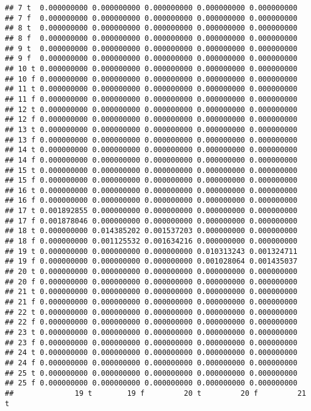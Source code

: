 \documentclass[]{article}
\begin{document}
\begin{verbatim}
## 7 t  0.000000000 0.000000000 0.000000000 0.000000000 0.000000000
## 7 f  0.000000000 0.000000000 0.000000000 0.000000000 0.000000000
## 8 t  0.000000000 0.000000000 0.000000000 0.000000000 0.000000000
## 8 f  0.000000000 0.000000000 0.000000000 0.000000000 0.000000000
## 9 t  0.000000000 0.000000000 0.000000000 0.000000000 0.000000000
## 9 f  0.000000000 0.000000000 0.000000000 0.000000000 0.000000000
## 10 t 0.000000000 0.000000000 0.000000000 0.000000000 0.000000000
## 10 f 0.000000000 0.000000000 0.000000000 0.000000000 0.000000000
## 11 t 0.000000000 0.000000000 0.000000000 0.000000000 0.000000000
## 11 f 0.000000000 0.000000000 0.000000000 0.000000000 0.000000000
## 12 t 0.000000000 0.000000000 0.000000000 0.000000000 0.000000000
## 12 f 0.000000000 0.000000000 0.000000000 0.000000000 0.000000000
## 13 t 0.000000000 0.000000000 0.000000000 0.000000000 0.000000000
## 13 f 0.000000000 0.000000000 0.000000000 0.000000000 0.000000000
## 14 t 0.000000000 0.000000000 0.000000000 0.000000000 0.000000000
## 14 f 0.000000000 0.000000000 0.000000000 0.000000000 0.000000000
## 15 t 0.000000000 0.000000000 0.000000000 0.000000000 0.000000000
## 15 f 0.000000000 0.000000000 0.000000000 0.000000000 0.000000000
## 16 t 0.000000000 0.000000000 0.000000000 0.000000000 0.000000000
## 16 f 0.000000000 0.000000000 0.000000000 0.000000000 0.000000000
## 17 t 0.001892855 0.000000000 0.000000000 0.000000000 0.000000000
## 17 f 0.001878046 0.000000000 0.000000000 0.000000000 0.000000000
## 18 t 0.000000000 0.014385202 0.001537203 0.000000000 0.000000000
## 18 f 0.000000000 0.001125532 0.001634216 0.000000000 0.000000000
## 19 t 0.000000000 0.000000000 0.000000000 0.010313243 0.001324711
## 19 f 0.000000000 0.000000000 0.000000000 0.001028064 0.001435037
## 20 t 0.000000000 0.000000000 0.000000000 0.000000000 0.000000000
## 20 f 0.000000000 0.000000000 0.000000000 0.000000000 0.000000000
## 21 t 0.000000000 0.000000000 0.000000000 0.000000000 0.000000000
## 21 f 0.000000000 0.000000000 0.000000000 0.000000000 0.000000000
## 22 t 0.000000000 0.000000000 0.000000000 0.000000000 0.000000000
## 22 f 0.000000000 0.000000000 0.000000000 0.000000000 0.000000000
## 23 t 0.000000000 0.000000000 0.000000000 0.000000000 0.000000000
## 23 f 0.000000000 0.000000000 0.000000000 0.000000000 0.000000000
## 24 t 0.000000000 0.000000000 0.000000000 0.000000000 0.000000000
## 24 f 0.000000000 0.000000000 0.000000000 0.000000000 0.000000000
## 25 t 0.000000000 0.000000000 0.000000000 0.000000000 0.000000000
## 25 f 0.000000000 0.000000000 0.000000000 0.000000000 0.000000000
##              19 t        19 f         20 t         20 f         21 t

\end{verbatim}
\end{document}
